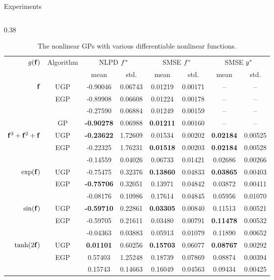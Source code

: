 \documentclass[final]{beamer}
\newlength{\twocolwid}
\begin{document}
\begin{frame}[t]
\begin{columns}[t]
\begin{column}{\twocolwid}
\begin{columns}[t,totalwidth=\twocolwid]
\begin{column}{\twocolwid}
\begin{block}{Experiments}
\begin{columns}
\begin{column}{0.38\twocolwid}
\begin{table}[tb]
    \centering
    \caption[]{The nonlinear GPs with various differentiable nonlinear functions.}
    \tiny
    \begin{tabular}{r|c| c c c c c c}
        \multirow{2}{*}{$g\!\left({{\mathbf{f}}}\right)$} & \multirow{2}{*}{Algorithm} & 
            \multicolumn{2}{c}{NLPD $f^{*}$} &
            \multicolumn{2}{c}{SMSE $f^{*}$} &
            \multicolumn{2}{c}{SMSE $y^{*}$} \\
        & & mean & std. & mean & std. & mean & std.\\
        \toprule
        $\mathbf{f}$ 
& UGP & -0.90046 & 0.06743 & 0.01219 & 0.00171 & -- & -- \\
& EGP & -0.89908 & 0.06608 & 0.01224 & 0.00178 & -- & -- \\
& \cite{Opper2009} & -0.27590 & 0.06884 & 0.01249 & 0.00159 & -- & -- \\
& GP & \textbf{-0.90278} & 0.06988 & \textbf{0.01211} & 0.00160 & -- & -- \\
        \midrule
        $\mathbf{f}^3 + \mathbf{f}^2 + \mathbf{f}$ 
& UGP & \textbf{-0.23622} & 1.72609 & 0.01534 & 0.00202 & \textbf{0.02184} & 0.00525 \\
& EGP & -0.22325 & 1.76231 & \textbf{0.01518} & 0.00203 & \textbf{0.02184} & 0.00528 \\
& \cite{Opper2009} & -0.14559 & 0.04026 & 0.06733 & 0.01421 & 0.02686 & 0.00266 \\
        \midrule
        $\exp\!\left({\mathbf{f}}\right)$ 
& UGP & -0.75475 & 0.32376 & \textbf{0.13860} & 0.04833 & \textbf{0.03865} & 0.00403 \\
& EGP & \textbf{-0.75706} & 0.32051 & 0.13971 & 0.04842 & 0.03872 & 0.00411 \\
& \cite{Opper2009} & -0.08176 & 0.10986 & 0.17614 & 0.04845 & 0.05956 & 0.01070 \\
        \midrule
        $\sin\!\left({\mathbf{f}}\right)$ 
& UGP & \textbf{-0.59710} & 0.22861 & \textbf{0.03305} & 0.00840 & 0.11513 & 0.00521 \\
& EGP & -0.59705 & 0.21611 & 0.03480 & 0.00791 & \textbf{0.11478} & 0.00532 \\
& \cite{Opper2009} & -0.04363 & 0.03883 & 0.05913 & 0.01079 & 0.11890 & 0.00652 \\
        \midrule
        $\tanh\!\left({2\mathbf{f}}\right)$
& UGP & \textbf{0.01101} & 0.60256 & \textbf{0.15703} & 0.06077 & \textbf{0.08767} & 0.00292 \\
& EGP & 0.57403 & 1.25248 & 0.18739 & 0.07869 & 0.08874 & 0.00394 \\
& \cite{Opper2009} & 0.15743 & 0.14663 & 0.16049 & 0.04563 & 0.09434 & 0.00425 \\
        \bottomrule
    \end{tabular}
    \label{tab:toy}
\end{table}


\end{column}
\end{columns}
\end{block}
\end{column}
\end{columns}
\end{column}
\end{columns}
\end{frame}
\end{document}
